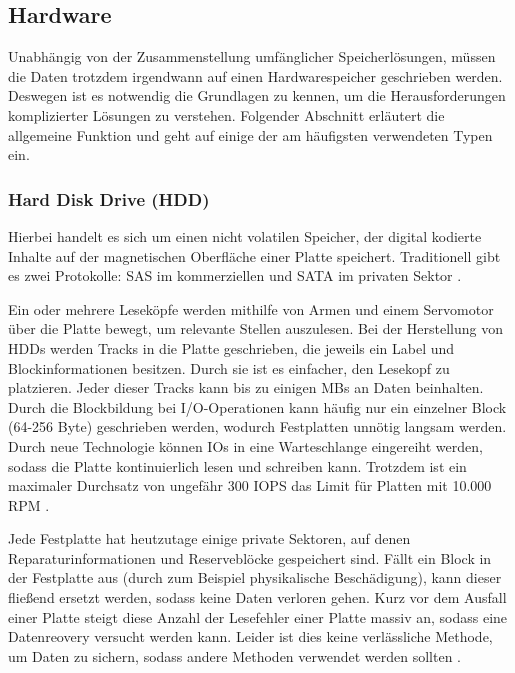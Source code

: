 \subsection{Hardware}

Unabhängig von der Zusammenstellung umfänglicher Speicherlösungen, müssen die Daten trotzdem irgendwann auf einen Hardwarespeicher geschrieben werden. Deswegen ist es notwendig die Grundlagen zu kennen, um die Herausforderungen komplizierter Lösungen zu verstehen. Folgender Abschnitt erläutert die allgemeine Funktion und geht auf einige der am häufigsten verwendeten Typen ein.

\subsubsection{Hard Disk Drive (HDD)}

Hierbei handelt es sich um einen nicht volatilen Speicher, der digital kodierte Inhalte auf der magnetischen Oberfläche einer Platte speichert. Traditionell gibt es zwei Protokolle: \ac{SAS} im kommerziellen und \ac{SATA} im privaten Sektor \parencite{wikibooks.2016}.

Ein oder mehrere Leseköpfe werden mithilfe von Armen und einem Servomotor über die Platte bewegt, um relevante Stellen auszulesen. Bei der Herstellung von HDDs werden Tracks in die Platte geschrieben, die jeweils ein Label und Blockinformationen besitzen. Durch sie ist es einfacher, den Lesekopf zu platzieren. Jeder dieser Tracks kann bis zu einigen MBs an Daten beinhalten. Durch die Blockbildung bei I/O-Operationen kann häufig nur ein einzelner Block (64-256 Byte) geschrieben werden, wodurch Festplatten unnötig langsam werden. Durch neue Technologie können IOs in eine Warteschlange eingereiht werden, sodass die Platte kontinuierlich lesen und schreiben kann. Trotzdem ist ein maximaler Durchsatz von ungefähr 300 \gls{IOPS} das Limit für Platten mit 10.000 RPM \parencite[Kap. 3]{kaufmann.2016}.

Jede Festplatte hat heutzutage einige private Sektoren, auf denen Reparaturinformationen und Reserveblöcke gespeichert sind. Fällt ein Block in der Festplatte aus (durch zum Beispiel physikalische Beschädigung), kann dieser fließend ersetzt werden, sodass keine Daten verloren gehen. Kurz vor dem Ausfall einer Platte steigt diese Anzahl der Lesefehler einer Platte massiv an, sodass eine Datenreovery versucht werden kann. Leider ist dies keine verlässliche Methode, um Daten zu sichern, sodass andere Methoden verwendet werden sollten \parencite[Kap. 3]{kaufmann.2016}.

